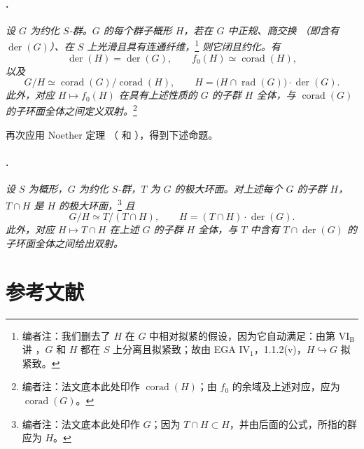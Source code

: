 \paragraph{.}
\textit{设 \(G\) 为约化 \(S\)-群。\(G\) 的每个群子概形 \(H\)，若在 \(G\) 中正规、商交换 \textup{（即含有 \(\operatorname{der}(G)\)）}、在 \(S\) 上光滑且具有连通纤维，}\footnote{编者注：我们删去了 \(H\) 在 \(G\) 中相对拟紧的假设，因为它自动满足：由第 \(\mathrm{VI_B}\) 讲 ，\(G\) 和 \(H\) 都在 \(S\) 上分离且拟紧致；故由 EGA \(\mathrm{IV}_1\)，1.1.2\textup{(v)}，\(H\hookrightarrow G\) 拟紧致。}
\textit{则它闭且约化。有}
\[
  \operatorname{der}(H)=\operatorname{der}(G),
  \qquad
  f_0(H)\simeq\operatorname{corad}(H),
\]
\textit{以及}
\[
  G/H\simeq
  \operatorname{corad}(G)/\operatorname{corad}(H),
  \qquad
  H=
  \bigl(H\cap\operatorname{rad}(G)\bigr)
  \cdot\operatorname{der}(G).
\]
\textit{此外，对应 \(H\mapsto f_0(H)\) 在具有上述性质的 \(G\) 的子群 \(H\) 全体，与 \(\operatorname{corad}(G)\) 的子环面全体之间定义双射。}\footnote{编者注：法文底本此处印作 \(\operatorname{corad}(H)\)；由 \(f_0\) 的余域及上述对应，应为 \(\operatorname{corad}(G)\)。}

再次应用 Noether 定理 \textup{（ 和 ）}，得到下述命题。

\paragraph{.}
\textit{设 \(S\) 为概形，\(G\) 为约化 \(S\)-群，\(T\) 为 \(G\) 的极大环面。对上述每个 \(G\) 的子群 \(H\)，\(T\cap H\) 是 \(H\) 的极大环面，}\footnote{编者注：法文底本此处印作 \(G\)；因为 \(T\cap H\subset H\)，并由后面的公式，所指的群应为 \(H\)。}
\textit{且}
\[
  G/H\simeq T/(T\cap H),
  \qquad
  H=(T\cap H)\cdot\operatorname{der}(G).
\]
\textit{此外，对应 \(H\mapsto T\cap H\) 在上述 \(G\) 的子群 \(H\) 全体，与 \(T\) 中含有 \(T\cap\operatorname{der}(G)\) 的子环面全体之间给出双射。}

\clearpage
{}
\section*{参考文献}

